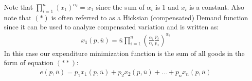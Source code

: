 \documentclass{article}
\begin{document}
  Note that $\prod_{i=1}^{n}(x_{1})^{\alpha_{i}} = x_{1}$ since the sum of $\alpha_{i}$ is 1 and $x_{i}$ is a constant. Also note that $(*)$ is often referred to as a Hicksian (compensated) Demand function since it can be used to analyze compensated variation and is written as:
  \begin{gather*}
    x_{1}(p,\overline{u}) = \overline{u} \prod_{i=1}^{n} (\frac{\alpha_{1}}{\alpha_{i}}\frac{p_{i}}{p_{1}})^{\alpha_{i}} \ \tag{**}
  \end{gather*}
  In this case our expenditure minimization function is the sum of all goods in the form of equation $(**)$:
  \begin{gather*}
    e(p,\overline{u}) = p_{1}x_{1}(p,\overline{u}) + p_{2}x_{2}(p,\overline{u}) + \dots + p_{n}x_{n}(p,\overline{u}) \ \tag{***}
  \end{gather*}
\end{document}
